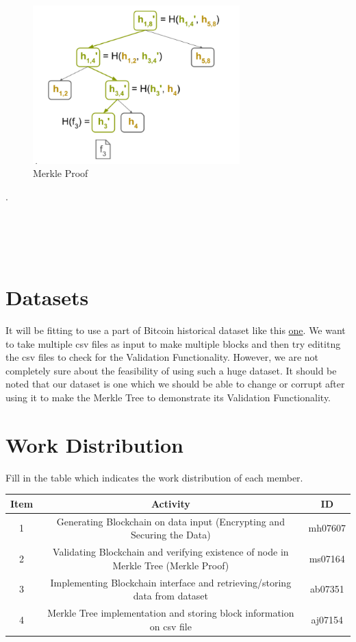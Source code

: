 \documentclass{article}
\begin{document}
\begin{figure}[htp]
    \centering
    \includegraphics[width=8cm]{Merkle Proof}
    \caption{Merkle Proof}
    \label{fig:f4}
\end{figure}
.
\\\\\\\\\\
\section{Datasets}
It will be fitting to use a part of Bitcoin historical dataset like this \href{https://www.kaggle.com/datasets/prasoonkottarathil/btcinusd}{ one}. We want to take multiple csv files as input to make multiple blocks and then try edititng the csv files to check for the Validation Functionality. However, we are not completely sure about the feasibility of using such a huge dataset. It should be noted that our dataset is one which we should be able to change or corrupt after using it to make the Merkle Tree to demonstrate its Validation Functionality. 

\newpage
\section{Work Distribution}
Fill in the table which indicates the work distribution of each member.
\begin{center}
  \begin{table}[h]
    \centering
    \begin{tabular}{|c|c|c|}
      \hline
      Item & Activity   & ID      \\ \hline
      1    & Generating Blockchain on data input (Encrypting and Securing the Data)  & mh07607 \\ \hline
      2    & Validating Blockchain and verifying existence of node in Merkle Tree (Merkle Proof) & ms07164 \\ \hline
      3    & Implementing Blockchain interface and retrieving/storing data from dataset & ab07351 \\ \hline
      4    & Merkle Tree implementation and storing block information on csv file & aj07154 \\ \hline
    \end{tabular}

    \label{tab:my-table6}
  \end{table}
\end{center}
\end{document}
